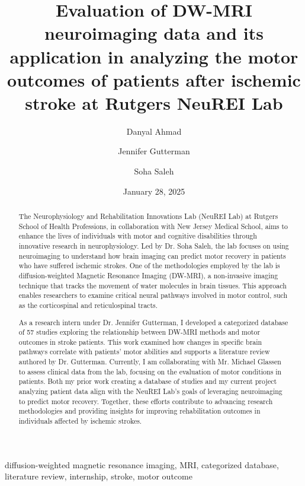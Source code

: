 ﻿\documentclass[12pt,conference,onecolumn]{IEEEtran}
\title{Evaluation of DW-MRI neuroimaging data and its application in analyzing the motor outcomes of patients after ischemic stroke at Rutgers NeuREI Lab}
\author{Danyal Ahmad \and Jennifer Gutterman \and Soha Saleh}
\date{January 28, 2025}
\newcommand{\keywords}{diffusion-weighted magnetic resonance imaging, MRI, categorized database, literature review, internship, stroke, motor outcome}
\begin{document}
\maketitle 

\begin{abstract}
The Neurophysiology and Rehabilitation Innovations Lab (NeuREI Lab) at Rutgers School of Health Professions, in collaboration with New Jersey Medical School, aims to enhance the lives of individuals with motor and cognitive disabilities through innovative research in neurophysiology. Led by Dr. Soha Saleh, the lab focuses on using neuroimaging to understand how brain imaging can predict motor recovery in patients who have suffered ischemic strokes. One of the methodologies employed by the lab is diffusion-weighted Magnetic Resonance Imaging (DW-MRI), a non-invasive imaging technique that tracks the movement of water molecules in brain tissues. This approach enables researchers to examine critical neural pathways involved in motor control, such as the corticospinal and reticulospinal tracts.

As a research intern under Dr. Jennifer Gutterman, I developed a categorized database of 57 studies exploring the relationship between DW-MRI methods and motor outcomes in stroke patients. This work examined how changes in specific brain pathways correlate with patients' motor abilities and supports a literature review authored by Dr. Gutterman. Currently, I am collaborating with Mr. Michael Glassen to assess clinical data from the lab, focusing on the evaluation of motor conditions in patients. Both my prior work creating a database of studies and my current project analyzing patient data align with the NeuREI Lab's goals of leveraging neuroimaging to predict motor recovery. Together, these efforts contribute to advancing research methodologies and providing insights for improving rehabilitation outcomes in individuals affected by ischemic strokes.
\end{abstract}

\begin{IEEEkeywords}
\keywords
\end{IEEEkeywords}
\end{document}
